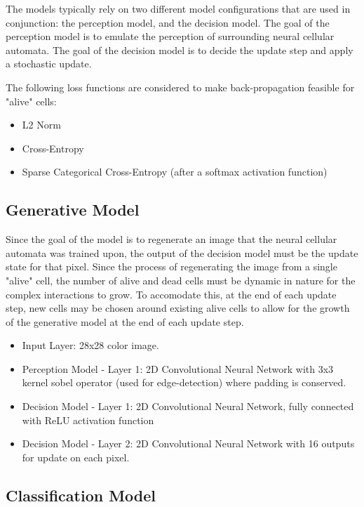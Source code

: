 \documentclass[conference]{IEEEtran}
\begin{document}
The models typically rely on two different model configurations that are used in conjunction: the perception model, and the decision model. The goal of the perception model is to emulate the perception of surrounding neural cellular automata. The goal of the decision model is to decide the update step and apply a stochastic update.

The following loss functions are considered to make back-propagation feasible for "alive" cells:

\begin{itemize}
    \item L2 Norm
    \item Cross-Entropy
    \item Sparse Categorical Cross-Entropy (after a softmax activation function)
\end{itemize}

\subsection{Generative Model}

Since the goal of the model is to regenerate an image that the neural cellular automata was trained upon, the output of the decision model must be the update state for that pixel. Since the process of regenerating the image from a single "alive" cell, the number of alive and dead cells must be dynamic in nature for the complex interactions to grow. To accomodate this, at the end of each update step, new cells may be chosen around existing alive cells to allow for the growth of the generative model at the end of each update step.

\begin{itemize}
    \item Input Layer: 28x28 color image.
    \item Perception Model - Layer 1: 2D Convolutional Neural Network with 3x3 kernel sobel operator (used for edge-detection) where padding is conserved.
    \item Decision Model - Layer 1: 2D Convolutional Neural Network, fully connected with ReLU activation function
    \item Decision Model - Layer 2: 2D Convolutional Neural Network with 16 outputs for update on each pixel.
\end{itemize}


\subsection{Classification Model}
\end{document}
